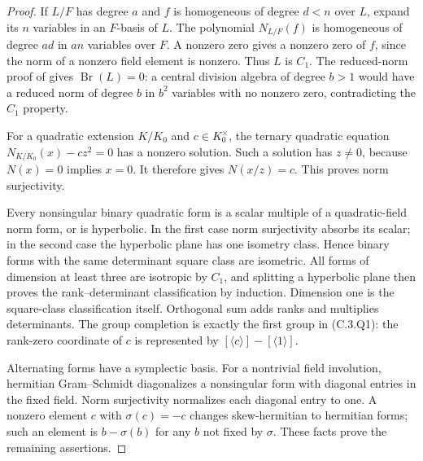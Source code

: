 \begin{proof}
If $L/F$ has degree $a$ and $f$ is homogeneous of degree $d<n$ over $L$,
expand its $n$ variables in an $F$-basis of $L$. The polynomial
$N_{L/F}(f)$ is homogeneous of degree $ad$ in $an$ variables over $F$.
A nonzero zero gives a nonzero zero of $f$, since the norm of a nonzero
field element is nonzero. Thus $L$ is $C_1$. The reduced-norm proof of
\cite[Theorem 59.67.8, Tag 03RC]{C-StacksC1Fields} gives
$\operatorname{Br}(L)=0$: a central division algebra of degree $b>1$
would have a reduced norm of degree $b$ in $b^2$ variables with no
nonzero zero, contradicting the $C_1$ property.

For a quadratic extension $K/K_0$ and $c\in K_0^\times$, the ternary
quadratic equation $N_{K/K_0}(x)-cz^2=0$ has a nonzero solution.
Such a solution has $z\ne0$, because $N(x)=0$ implies $x=0$.
It therefore gives $N(x/z)=c$. This proves norm surjectivity.

Every nonsingular binary quadratic form is a scalar multiple of a
quadratic-field norm form, or is hyperbolic. In the first case norm
surjectivity absorbs its scalar; in the second case the hyperbolic
plane has one isometry class. Hence binary forms with the same
determinant square class are isometric. All forms of dimension at
least three are isotropic by $C_1$, and splitting a hyperbolic plane
then proves the rank--determinant classification by induction.
Dimension one is the square-class classification itself.
Orthogonal sum adds ranks and multiplies determinants. The group
completion is exactly the first group in (C.3.Q1): the rank-zero
coordinate of $c$ is represented by
$[\langle c\rangle]-[\langle1\rangle]$.

Alternating forms have a symplectic basis. For a nontrivial field
involution, hermitian Gram--Schmidt diagonalizes a nonsingular form
with diagonal entries in the fixed field. Norm surjectivity normalizes
each diagonal entry to one. A nonzero element $c$ with
$\sigma(c)=-c$ changes skew-hermitian to hermitian forms; such an
element is $b-\sigma(b)$ for any $b$ not fixed by $\sigma$.
These facts prove the remaining assertions.
\end{proof}

